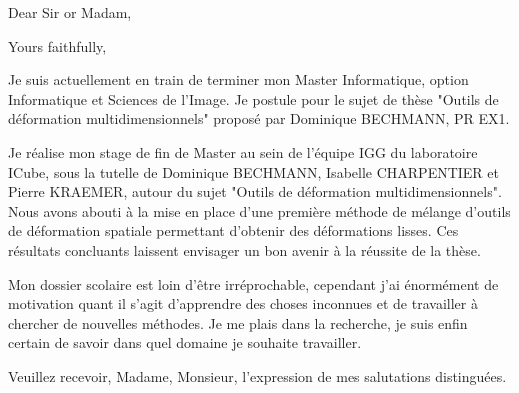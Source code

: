 \documentclass[11pt,a4paper,sans]{moderncv}        %
\begin{document}

% 


\clearpage
\date{\today}
\opening{Dear Sir or Madam,}
\closing{Yours faithfully,}
\makelettertitle

Je suis actuellement en train de terminer mon Master Informatique, option Informatique et Sciences de l'Image. Je postule pour le sujet de thèse "Outils de déformation multidimensionnels" proposé par Dominique BECHMANN, PR EX1.

Je réalise mon stage de fin de Master au sein de l'équipe IGG du laboratoire ICube, sous la tutelle de Dominique BECHMANN, Isabelle CHARPENTIER et Pierre KRAEMER, autour du sujet "Outils de déformation multidimensionnels". Nous avons abouti à la mise en place d'une première méthode de mélange d'outils de déformation spatiale permettant d'obtenir des déformations lisses. Ces résultats concluants laissent envisager un bon avenir à la réussite de la thèse.

Mon dossier scolaire est loin d'être irréprochable, cependant j'ai énormément de motivation quant il s'agit d'apprendre des choses inconnues et de travailler à chercher de nouvelles méthodes. Je me plais dans la recherche, je suis enfin certain de savoir dans quel domaine je souhaite travailler.

Veuillez recevoir, Madame, Monsieur, l'expression de mes salutations distinguées.

\makeletterclosing

\end{document}
